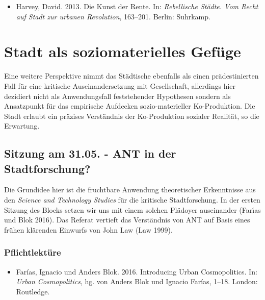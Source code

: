 \documentclass[
  ngerman,
]{article}
\providecommand{\tightlist}{%
  \setlength{\itemsep}{0pt}\setlength{\parskip}{0pt}}
\begin{document}
\begin{itemize}
\tightlist
\item
  Harvey, David. 2013. Die Kunst der Rente. In: \emph{Rebellische Städte. Vom Recht auf Stadt zur urbanen Revolution}, 163--201. Berlin: Suhrkamp.
\end{itemize}

\pagebreak

\hypertarget{stadt-als-soziomaterielles-gefuxfcge}{%
\section{Stadt als soziomaterielles Gefüge}\label{stadt-als-soziomaterielles-gefuxfcge}}

Eine weitere Perspektive nimmt das Städtische ebenfalls als einen prädestinierten Fall für eine kritische Auseinandersetzung mit Gesellschaft, allerdings hier dezidiert nicht als Anwendungsfall feststehender Hypothesen sondern als Ansatzpunkt für das empirische Aufdecken sozio-materieller Ko-Produktion. Die Stadt erlaubt ein präzises Verständnis der Ko-Produktion sozialer Realität, so die Erwartung.

\hypertarget{sitzung-am-31.05.---ant-in-der-stadtforschung}{%
\subsection{Sitzung am 31.05. - ANT in der Stadtforschung?}\label{sitzung-am-31.05.---ant-in-der-stadtforschung}}

Die Grundidee hier ist die fruchtbare Anwendung theoretischer Erkenntnisse aus den \emph{Science and Technology Studies} für die kritische Stadtforschung. In der ersten Sitzung des Blocks setzen wir uns mit einem solchen Plädoyer auseinander (Farı́as und Blok 2016). Das Referat vertieft das Verständnis von ANT auf Basis eines frühen klärenden Einwurfs von John Law (Law 1999).

\hypertarget{pflichtlektuxfcre-5}{%
\subsubsection*{Pflichtlektüre}\label{pflichtlektuxfcre-5}}

\begin{itemize}
\tightlist
\item
  Farías, Ignacio und Anders Blok. 2016. Introducing Urban Cosmopolitics. In: \emph{Urban Cosmopolitics}, hg. von Anders Blok und Ignacio Farías, 1--18. London: Routledge.
\end{itemize}
\end{document}
